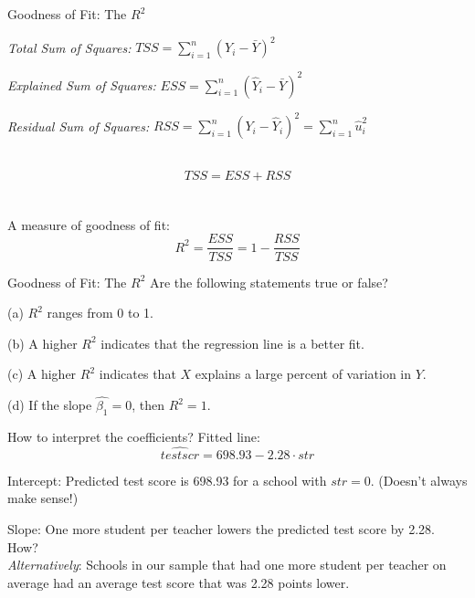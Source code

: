 \documentclass{./../div_teaching_slides}
\begin{document}
\begin{frame}{Goodness of Fit: The $R^2$}
\begin{witemize}
\item[]   \textit{Total Sum of Squares:} $TSS = \sum_{i=1}^n (Y_i-\bar{Y})^2 $
\item[]  \textit{Explained Sum of Squares:} $  ESS = \sum_{i=1}^n (\hat{Y}_i-\bar{Y})^2 $
\item[]   \textit{Residual Sum of Squares:} $  RSS = \sum_{i=1}^n (Y_i-\hat{Y}_i)^2 =\sum_{i=1}^n \hat{u}_i^2$ \\~\\
\end{witemize}
$$ TSS = ESS + RSS $$ \\~\\
A measure of goodness of fit: 
$$ R^2 = \frac{ESS}{TSS} = 1-\frac{RSS}{TSS} $$
\end{frame}

\begin{frame}{Goodness of Fit: The $R^2$}
Are the following statements true or false? \\ \vspace{0.5em}
\begin{witemize}
  \item[(a)]  $R^2$ ranges from 0 to 1.
  \item[(b)] A higher $R^2$ indicates that the regression line is a better fit.
  \item[(c)] A higher $R^2$ indicates that $X$ explains a large percent of variation in $Y$.
  \item[(d)] If the slope $\hat{\beta_1}=0$, then $R^2=1$.
  \end{witemize}
\end{frame}

\begin{frame}{How to interpret the coefficients?}
Fitted line:
$$ \hat{testscr} = 698.93 -2.28 \cdot str $$
\pause 
\begin{witemize}
  \item Intercept: Predicted test score is 698.93 for a school with $str=0$. (Doesn't always make sense!)
  \item Slope: One more student per teacher lowers the predicted test score by 2.28. How? \\ \vspace{0.25em}
   \textit{Alternatively}: Schools in our sample that had one more student per teacher on average had an average test score that was 2.28 points lower.
\end{witemize}
\end{frame}
\end{document}
